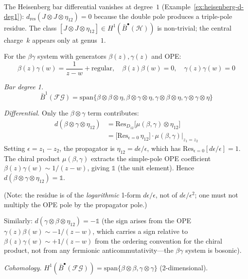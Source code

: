 \begin{example}\label{ex:heisenberg-deg1-complete}
The Heisenberg bar differential vanishes at degree~$1$
(Example~\ref{ex:heisenberg-d-deg1}):
$d_{\mathrm{res}}(J \otimes J \otimes \eta_{12}) = 0$
because the double pole produces a triple-pole residue.
The class
$[J \otimes J \otimes \eta_{12}]
\in H^1(\bar{B}^{\bullet}(\mathcal{H}))$
is non-trivial; the central charge~$k$ appears only at
genus~$1$.
\end{example}

\begin{example}\label{ex:betagamma-deg1}
For the $\beta\gamma$ system with generators $\beta(z), \gamma(z)$ and OPE:
\[\beta(z)\gamma(w) = \frac{1}{z-w} + \text{regular}, \quad \beta(z)\beta(w) = 0, \quad \gamma(z)\gamma(w) = 0\]

\emph{Bar degree 1.}
\[\bar{B}^1(\mathcal{FG}) = \text{span}\{\beta \otimes \beta \otimes \eta, \beta \otimes \gamma \otimes \eta, \gamma \otimes \beta \otimes \eta, \gamma \otimes \gamma \otimes \eta\}\]

\emph{Differential.} Only the $\beta \otimes \gamma$ term contributes:
\begin{align*}
d(\beta \otimes \gamma \otimes \eta_{12}) &= \text{Res}_{D_{12}}\bigl[\mu(\beta, \gamma) \otimes \eta_{12}\bigr] \\
&= \bigl[\text{Res}_{\epsilon=0}\,\eta_{12}\bigr] \cdot \mu(\beta, \gamma)\big|_{z_1=z_2}
\end{align*}
Setting $\epsilon = z_1 - z_2$, the propagator is $\eta_{12} = d\epsilon/\epsilon$, which has $\text{Res}_{\epsilon=0}[d\epsilon/\epsilon] = 1$. The chiral product $\mu(\beta, \gamma)$ extracts the simple-pole OPE coefficient $\beta(z)\gamma(w) \sim 1/(z-w)$, giving $\mathbb{1}$ (the unit element). Hence $d(\beta \otimes \gamma \otimes \eta_{12}) = \mathbb{1}$.

(Note: the residue is of the \emph{logarithmic} 1-form $d\epsilon/\epsilon$, not of $d\epsilon/\epsilon^2$; one must not multiply the OPE pole by the propagator pole.)

Similarly: $d(\gamma \otimes \beta \otimes \eta_{12}) = -\mathbb{1}$ (the sign arises from the OPE $\gamma(z)\beta(w) \sim -1/(z-w)$, which carries a sign relative to $\beta(z)\gamma(w) \sim +1/(z-w)$ from the ordering convention for the chiral product, not from any fermionic anticommutativity---the $\beta\gamma$ system is bosonic).

\emph{Cohomology.} $H^1(\bar{B}^{\bullet}(\mathcal{FG})) = \text{span}\{\beta \otimes \beta, \gamma \otimes \gamma\}$ (2-dimensional).
\end{example}

